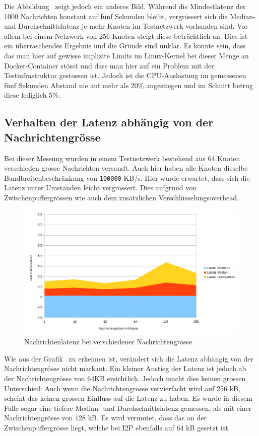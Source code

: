 Die Abbildung~ zeigt jedoch ein anderes Bild.
Während die Mindestlatenz der 1000 Nachrichten konstant auf fünf Sekunden bleibt, vergrössert sich die Median- und Durchschnittslatenz je mehr Knoten im Testnetzwerk vorhanden sind.
Vor allem bei einem Netzwerk von 256 Knoten steigt diese beträchtlich an.
Dies ist ein überraschendes Ergebnis und die Gründe sind unklar.
Es könnte sein, dass das man hier auf gewisse implizite Limits im Linux-Kernel bei dieser Menge an Docker-Container stösst
und dass man hier auf ein Problem mit der Testinfrastruktur gestossen ist.
Jedoch ist die CPU-Auslastung im gemessenen fünf Sekunden Abstand nie auf mehr als 20\% angestiegen und im Schnitt betrug diese lediglich 5\%.

\subsection{Verhalten der Latenz abhängig von der Nachrichtengrösse}\label{sec:messung_nachrichtengroesse}

Bei dieser Messung wurden in einem Testnetzwerk bestehend aus 64 Knoten verschieden grosse Nachrichten versandt.
Auch hier haben alle Knoten dieselbe Bandbreitenbeschränkung von \lstinline|100000| KB/s.
Hier wurde erwartet, dass sich die Latenz unter Umständen leicht vergrössert. Dies aufgrund von Zwischenpuffergrössen wie auch dem zusätzlichen Verschlüsselungsoverhead.

\begin{figure}[htp]
  \includegraphics[width=1.1\textwidth]{img/auswertung-nachrichtengroesse.png}
  \caption{Nachrichtenlatenz bei verschiedener Nachrichtengrösse}\label{fig:auswertung-nachrichtengroesse}
\end{figure}

Wie aus der Grafik~ zu erkennen ist, verändert sich die Latenz abhängig von der Nachrichtengrösse nicht markant.
Ein kleiner Anstieg der Latenz ist jedoch ab der Nachrichtengrösse von 64KB ersichtlich.
Jedoch macht dies keinen grossen Unterschied: Auch wenn die Nachrichtengrösse vervierfacht wird auf 256 kB, scheint das keinen grossen Einfluss auf die Latenz zu haben.
Es wurde in diesem Falle sogar eine tiefere Median- und Durchschnittslatenz gemessen, als mit einer Nachrichtengrösse von 128 kB.
Es wird vermutet, dass das an der Zwischenpuffergrösse liegt, welche bei I2P ebenfalls auf 64 kB gesetzt ist.

